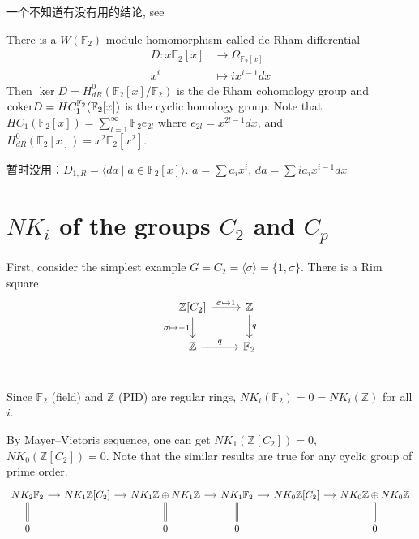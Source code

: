 \begin{remark}
	一个不知道有没有用的结论, see \cite{MR96j:16008} 

	There is a $W(\mathbb{F}_2)$-module homomorphism called de Rham differential
	\begin{align*}
	D\colon x \mathbb{F}_2[x] &\longrightarrow \Omega_{\mathbb{F}_2[x]}\\
	x^i &\mapsto ix^{i-1}dx
	\end{align*}
	Then $\ker D = H_{dR}^0(\mathbb{F}_2[x]/\mathbb{F}_2)$ is the de Rham cohomology group and $\mathrm{coker} D = HC_1^{\mathbb{F}_2}(\mathbb{F}_2[x])$ is the cyclic homology group. Note that $HC_1(\mathbb{F}_2[x])= \sum_{l=1}^{\infty}\mathbb{F}_2 e_{2l}$ where $e_{2l}=x^{2l-1}dx$, and $H_{dR}^0(\mathbb{F}_2[x])=x^2 \mathbb{F}_2[x^2]$.

	暂时没用：$D_{1,R}=\langle d a\mid a\in \mathbb{F}_2[x]\rangle$. $a=\sum a_ix^i$, $d a=\sum ia_ix^{i-1}dx $
\end{remark}
\section{\texorpdfstring{$NK_i$}{NKi} of the groups \texorpdfstring{$C_2$ and $C_p$}{C2 and Cp}}
\label{sec:C2Cp}
First, consider the simplest example $G=C_2=\langle \sigma \rangle=\{1,\sigma\}$. There is a Rim square
\begin{equation}
\label{rimsqC2}
	\begin{tikzcd}
		\mathbb{Z}[C_2] \ar[r,"\sigma\mapsto 1"] \ar[d,"\sigma\mapsto -1"']& \mathbb{Z}\ar[d,"q"]\\
		 \mathbb{Z}\ar[r,"q"] & \mathbb{F}_2\\
	\end{tikzcd}
\end{equation}
	
Since $\mathbb{F}_2$ (field) and $\mathbb{Z}$ (PID) are regular rings, $NK_i(\mathbb{F}_2)=0=NK_i(\mathbb{Z})$ for all $i$.

By Mayer–Vietoris sequence, one can get $NK_1(\mathbb{Z}[C_2])=0$, $NK_0(\mathbb{Z}[C_2])=0$. Note that the similar results are true for any cyclic group of prime order.
	\[\begin{tikzcd}[column sep=small]
		NK_2 \mathbb{F}_2 \ar[r] \ar[d,equal]& NK_1 \mathbb{Z}[C_2] \ar[r] & NK_1 \mathbb{Z} \oplus NK_1 \mathbb{Z} \ar[r] \ar[d,equal]& NK_1 \mathbb{F}_2 \ar[r] \ar[d,equal] & NK_0 \mathbb{Z}[C_2] \ar[r]&NK_0 \mathbb{Z} \oplus NK_0 \mathbb{Z}  \ar[d,equal] \\
		0 & & 0 &0 & & 0\\
	\end{tikzcd}\]


